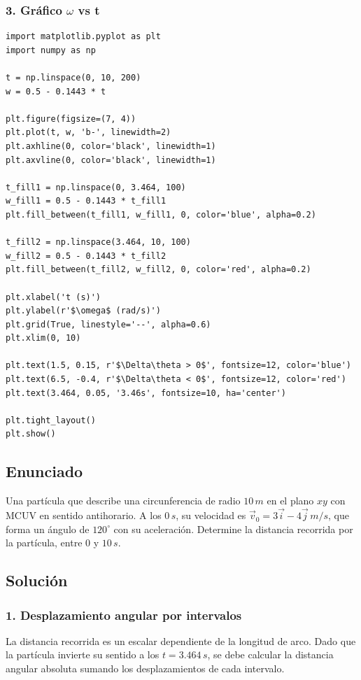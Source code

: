 \documentclass[12pt, a4paper]{article}
\begin{document}
\subsubsection*{3. Gráfico $\omega$ vs t}
\begin{lstlisting}
import matplotlib.pyplot as plt
import numpy as np

t = np.linspace(0, 10, 200)
w = 0.5 - 0.1443 * t

plt.figure(figsize=(7, 4))
plt.plot(t, w, 'b-', linewidth=2)
plt.axhline(0, color='black', linewidth=1)
plt.axvline(0, color='black', linewidth=1)

t_fill1 = np.linspace(0, 3.464, 100)
w_fill1 = 0.5 - 0.1443 * t_fill1
plt.fill_between(t_fill1, w_fill1, 0, color='blue', alpha=0.2)

t_fill2 = np.linspace(3.464, 10, 100)
w_fill2 = 0.5 - 0.1443 * t_fill2
plt.fill_between(t_fill2, w_fill2, 0, color='red', alpha=0.2)

plt.xlabel('t (s)')
plt.ylabel(r'$\omega$ (rad/s)')
plt.grid(True, linestyle='--', alpha=0.6)
plt.xlim(0, 10)

plt.text(1.5, 0.15, r'$\Delta\theta > 0$', fontsize=12, color='blue')
plt.text(6.5, -0.4, r'$\Delta\theta < 0$', fontsize=12, color='red')
plt.text(3.464, 0.05, '3.46s', fontsize=10, ha='center')

plt.tight_layout()
plt.show()
\end{lstlisting}

\newpage

\subsection*{Enunciado}
Una partícula que describe una circunferencia de radio $10 \, \si{m}$ en el plano $xy$ con MCUV en sentido antihorario. A los $0 \, \si{s}$, su velocidad es $\vec{v}_0 = 3\vec{i} - 4\vec{j} \, \si{m/s}$, que forma un ángulo de $120^\circ$ con su aceleración. Determine la distancia recorrida por la partícula, entre $0$ y $10 \, \si{s}$. 

\subsection*{Solución}

\subsubsection*{1. Desplazamiento angular por intervalos}
La distancia recorrida es un escalar dependiente de la longitud de arco. Dado que la partícula invierte su sentido a los $t = 3.464 \, \si{s}$, se debe calcular la distancia angular absoluta sumando los desplazamientos de cada intervalo.
\end{document}
